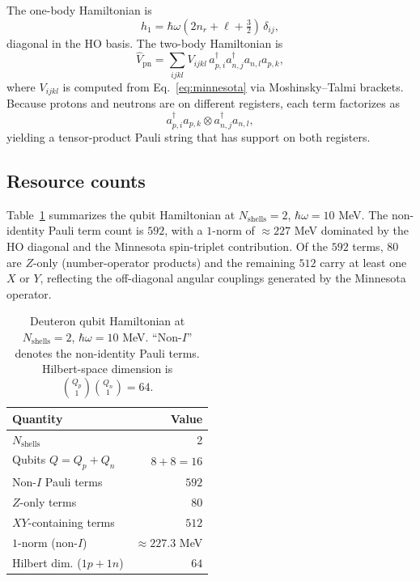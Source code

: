 \documentclass[twocolumn,prc,amsmath,amssymb,superscriptaddress]{revtex4-2}
\begin{document}
The one-body Hamiltonian is
\[
  h_1 = \hbar\omega (2 n_r + \ell + \tfrac{3}{2}) \, \delta_{ij},
\]
diagonal in the HO basis. The two-body Hamiltonian is
\[
  \hat V_{\mathrm{pn}} = \sum_{ijkl} V_{ijkl}
  \, a^\dagger_{p,i} a^\dagger_{n,j} a_{n,l} a_{p,k},
\]
where $V_{ijkl}$ is computed from Eq.~\eqref{eq:minnesota} via
Moshinsky--Talmi brackets. Because protons and neutrons are on
different registers, each term factorizes as
\[
  a^\dagger_{p,i} a_{p,k} \otimes a^\dagger_{n,j} a_{n,l},
\]
yielding a tensor-product Pauli string that has support on both
registers.

\subsection{Resource counts}

Table~\ref{tab:deuteron} summarizes the qubit Hamiltonian at
$N_{\mathrm{shells}}=2$, $\hbar\omega = 10$ MeV. The non-identity Pauli
term count is $592$, with a $1$-norm of $\approx 227$ MeV dominated by
the HO diagonal and the Minnesota spin-triplet contribution. Of the
$592$ terms, $80$ are $Z$-only (number-operator products) and the
remaining $512$ carry at least one $X$ or $Y$, reflecting the
off-diagonal angular couplings generated by the Minnesota operator.

\begin{table}[t]
  \centering
  \caption{Deuteron qubit Hamiltonian at $N_{\mathrm{shells}}=2$,
    $\hbar\omega = 10$ MeV. ``Non-$I$'' denotes the non-identity Pauli
    terms. Hilbert-space dimension is
    $\binom{Q_p}{1}\binom{Q_n}{1} = 64$.}
  \label{tab:deuteron}
  \begin{ruledtabular}
  \begin{tabular}{lr}
    Quantity & Value \\
    \hline
    $N_{\mathrm{shells}}$ & 2 \\
    Qubits $Q = Q_p + Q_n$ & $8 + 8 = 16$ \\
    Non-$I$ Pauli terms & $592$ \\
    $Z$-only terms & $80$ \\
    $XY$-containing terms & $512$ \\
    $1$-norm (non-$I$) & $\approx 227.3$ MeV \\
    Hilbert dim. ($1p+1n$) & $64$ \\
  \end{tabular}
  \end{ruledtabular}
\end{table}
\end{document}
